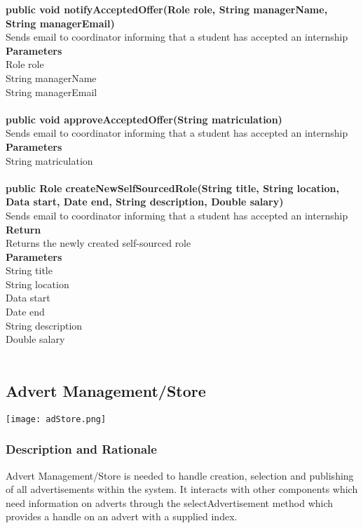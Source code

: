 \documentclass{l3deliverable}
\begin{document}
\textbf{public void notifyAcceptedOffer(Role role, String managerName, String managerEmail)}\\
Sends email to coordinator informing that a student has accepted an internship\\
\textbf{Parameters}\\
Role role\\
String managerName\\
String managerEmail\\
\\

\textbf{public void approveAcceptedOffer(String matriculation)}\\
Sends email to coordinator informing that a student has accepted an internship\\
\textbf{Parameters}\\
String matriculation\\
\\
\textbf{public Role createNewSelfSourcedRole(String title, String location, Data start, Date end, String description, Double salary)}\\
Sends email to coordinator informing that a student has accepted an internship\\
\textbf{Return}\\
Returns the newly created self-sourced role\\
\textbf{Parameters}\\
String title\\
String location\\
Data start\\
Date end\\
String description\\
Double salary\\
\\

\subsection{Advert Management/Store}
\texttt{[image: adStore.png]}

\subsubsection{Description and Rationale}
Advert Management/Store is needed to handle creation, selection and publishing of all advertisements within the system. It interacts with other components which need information on adverts through the selectAdvertisement method which provides a handle on an advert with a supplied index.
\end{document}
